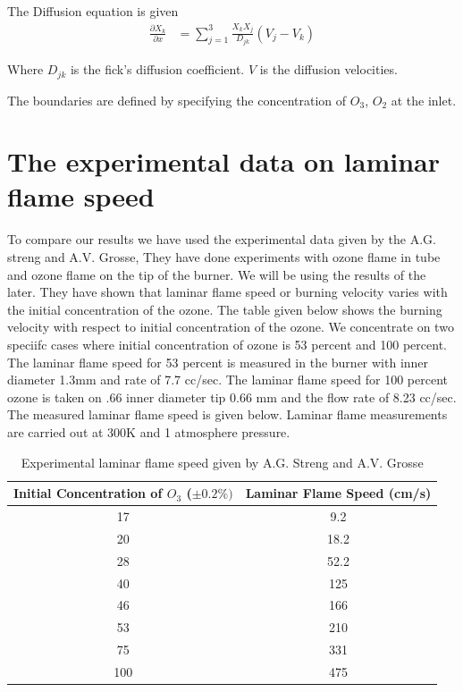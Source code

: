 \noindent The Diffusion equation is given 
\begin{eqnarray}
\frac{\partial X_k}{\partial x} &= \sum_{j=1}^{3} \frac{X_k X_j}{D_{jk}} (V_j - V_k)
\end{eqnarray}

\noindent Where $D_{jk}$ is the fick's diffusion coefficient. $V$ is the diffusion velocities. 

\noindent The boundaries are defined by specifying the concentration of $O_3$, $O_2$ at the inlet. 

\section{The experimental data on laminar flame speed}

To compare our results we have used the experimental data given by the A.G.  streng and A.V. Grosse, They have done experiments with ozone flame in tube and ozone flame on the tip of the burner. We will be using the results of the later. They have shown that laminar flame speed or burning velocity varies with the initial concentration of the ozone. The table given below shows the burning velocity with respect to initial concentration of the ozone. We concentrate on two speciifc cases where initial concentration of ozone is 53 percent and 100 percent. The laminar flame speed for 53 percent is measured in the burner with inner diameter 1.3mm  and rate of 7.7 cc/sec. The laminar flame speed for 100 percent ozone is taken on .66 inner diameter tip 0.66 mm and the flow rate of 8.23 cc/sec. 
The measured laminar flame speed is given below. Laminar flame measurements are carried out at 300K and 1 atmosphere pressure. 

\begin{table}[h]
\caption {Experimental laminar flame speed given by A.G. Streng and A.V. Grosse} \label{tab:title}
\begin{center}

\begin{tabular}{|c|c|}
\hline
 \textbf{ Initial Concentration of $O_3$ ($\pm 0.2 \% )$}  &  \textbf{ Laminar Flame Speed (cm/s)} \\ \hline
 17& 9.2 \\  \hline
 20& 18.2 \\ \hline
 28& 52.2 \\ \hline
 40& 125 \\  \hline
 46&  166 \\ \hline
 53&  210 \\ \hline
 75&  331 \\ \hline
100&  475 \\ \hline
\end{tabular}
\end{center}
\end{table}

